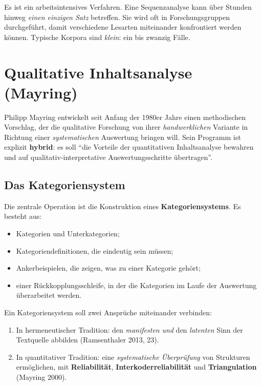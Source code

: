 \documentclass[a4paper,11pt]{article}
\begin{document}
Es ist ein arbeitsintensives Verfahren. Eine Sequenzanalyse kann
über Stunden hinweg \emph{einen einzigen Satz} betreffen. Sie wird
oft in Forschungsgruppen durchgeführt, damit verschiedene Lesarten
miteinander konfrontiert werden können. Typische Korpora sind
\emph{klein}: ein bis zwanzig Fälle.

\section{Qualitative Inhaltsanalyse (Mayring)}

Philipp Mayring entwickelt seit Anfang der 1980er Jahre einen
methodischen Vorschlag, der die qualitative Forschung von ihrer
\emph{handwerklichen} Variante in Richtung einer \emph{systematischen}
Auswertung bringen will. Sein Programm ist explizit \textbf{hybrid}:
es soll \enquote{die Vorteile der quantitativen Inhaltsanalyse bewahren
und auf qualitativ-interpretative Auswertungsschritte übertragen}.

\subsection{Das Kategoriensystem}

Die zentrale Operation ist die Konstruktion eines
\textbf{Kategoriensystems}. Es besteht aus:

\begin{itemize}
\item Kategorien und Unterkategorien;
\item Kategoriendefinitionen, die eindeutig sein müssen;
\item Ankerbeispielen, die zeigen, was zu einer Kategorie gehört;
\item einer Rückkopplungsschleife, in der die Kategorien im Laufe
der Auswertung überarbeitet werden.
\end{itemize}

Ein Kategoriensystem soll zwei Ansprüche miteinander verbinden:

\begin{enumerate}
\item In hermeneutischer Tradition: den \emph{manifesten} \emph{und}
den \emph{latenten} Sinn der Textquelle abbilden (Ramsenthaler 2013, 23).

\item In quantitativer Tradition: eine \emph{systematische Überprüfung}
von Strukturen ermöglichen, mit \textbf{Reliabilität},
\textbf{Inter\-ko\-der\-re\-lia\-bi\-li\-tät} und
\textbf{Triangulation} (Mayring 2000).
\end{enumerate}
\end{document}
